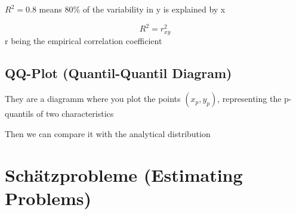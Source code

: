 \documentclass{article}
\begin{document}
$R^2=0.8$ means  80\% of the variability in y is explained by x

\[R^2 = r_{xy}^2\]
r being the empirical correlation coefficient

\subsection{QQ-Plot (Quantil-Quantil Diagram)}

They are a diagramm where you plot the points $(x_p,y_p)$, representing the p-quantils of two characteristics

Then we can compare it with the analytical distribution

\section{Schätzprobleme (Estimating Problems)}
\end{document}
